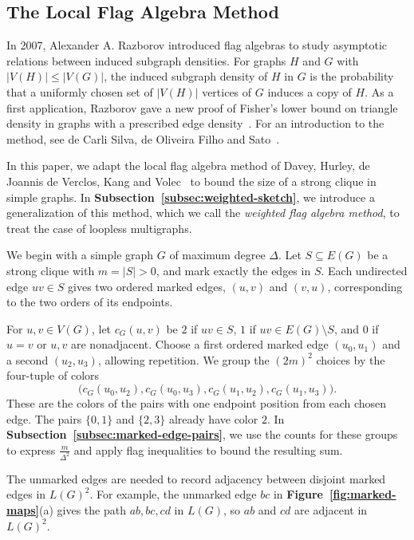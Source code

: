 \documentclass[preprint,11pt,numbers]{elsarticle-arxiv}
\numberwithin{equation}{section}
\theoremstyle{definition}
\begin{document}
\subsection{The Local Flag Algebra Method}\label{subsec:adapted-flags}

In 2007, Alexander A. Razborov introduced flag algebras to study
asymptotic relations between induced subgraph densities. For graphs
$H$ and $G$ with $|V(H)|\leq |V(G)|$, the induced subgraph density
of $H$ in $G$ is the probability that a uniformly chosen set of
$|V(H)|$ vertices of $G$ induces a copy of $H$. As a first application,
Razborov gave a new proof of Fisher's lower bound on triangle density
in graphs with a prescribed edge density~\cite{Razborov2007}. For an
introduction to the method, see de Carli Silva, de Oliveira Filho
and Sato~\cite{CarliSilvaOliveiraSato2016}.

In this paper, we adapt the local flag algebra method of Davey,
Hurley, de Joannis de Verclos, Kang and
Volec~\cite{DaveyEtAlLocal2026,DaveyEtAlStrong2026} to bound the size
of a strong clique in simple graphs. In
\textbf{Subsection~\ref{subsec:weighted-sketch}}, we introduce a
generalization of this method, which we call the \emph{weighted flag
algebra method}, to treat the case of loopless multigraphs.

We begin with a simple graph $G$ of maximum degree $\Delta$.
Let $S\subseteq E(G)$ be a strong clique with $m=|S|>0$, and mark
exactly the edges in $S$. Each undirected edge $uv\in S$ gives two
ordered marked edges, $(u,v)$ and $(v,u)$, corresponding to the two
orders of its endpoints.

For $u,v\in V(G)$, let $c_G(u,v)$ be $2$ if $uv\in S$, $1$ if
$uv\in E(G)\setminus S$, and $0$ if $u=v$ or $u,v$ are nonadjacent.
Choose a first ordered marked edge $(u_0,u_1)$ and a second
$(u_2,u_3)$, allowing repetition. We group the $(2m)^2$ choices
by the four-tuple of colors
\[
 \bigl(c_G(u_0,u_2),c_G(u_0,u_3),c_G(u_1,u_2),c_G(u_1,u_3)\bigr).
\]
These are the colors of the pairs with one endpoint position from
each chosen edge. The pairs $\{0,1\}$ and $\{2,3\}$ already have color
$2$. In \textbf{Subsection~\ref{subsec:marked-edge-pairs}}, we use the
counts for these groups to express $\frac{m}{\Delta^2}$ and apply flag
inequalities to bound the resulting sum.

The unmarked edges are needed to record adjacency between disjoint
marked edges in $L(G)^2$. For example, the unmarked edge $bc$ in
\textbf{Figure~\ref{fig:marked-maps}}(a) gives the path $ab,bc,cd$ in
$L(G)$, so $ab$ and $cd$ are adjacent in $L(G)^2$.
\end{document}
